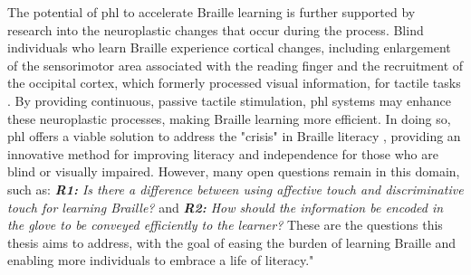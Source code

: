The potential of \gls{phl} to accelerate Braille learning is further supported by research into the neuroplastic changes that occur during the process. Blind individuals who learn Braille experience cortical changes, including enlargement of the sensorimotor area associated with the reading finger and the recruitment of the occipital cortex, which formerly processed visual information, for tactile tasks \cite{Hamilton1998a}. By providing continuous, passive tactile stimulation, \gls{phl} systems may enhance these neuroplastic processes, making Braille learning more efficient. In doing so, \gls{phl} offers a viable solution to address the "crisis" in Braille literacy \cite{Seim2014a}, providing an innovative method for improving literacy and independence for those who are blind or visually impaired.
However, many open questions remain in this domain, such as: \textit{\textbf{R1:} Is there a difference between using affective touch and discriminative touch for learning Braille?} and \textit{\textbf{R2:} How should the information be encoded in the glove to be conveyed efficiently to the learner?} These are the questions this thesis aims to address, with the goal of easing the burden of learning Braille and enabling more individuals to embrace a life of literacy."
